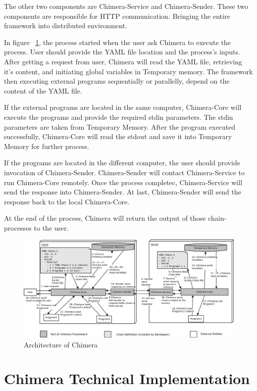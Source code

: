 \documentclass[conference]{IEEEtran}
\begin{document}
The other two components are Chimera-Service and Chimera-Sender. These two components
are responsible for HTTP communication. Bringing the entire framework into distributed
environment.

In figure ~\ref{fig:chimeraArchitecture}, the process started when the user ask Chimera 
to execute the process. User should provide the YAML file location and the process's
inputs. After getting a request from user, Chimera will read the YAML file, retrieving
it's content, and initiating global variables in Temporary memory. The framework then
executing external programs sequentially or parallelly, depend on the content of the
YAML file.

If the external programs are located in the same computer, Chimera-Core will execute the
programs and provide the required stdin parameters. The stdin parameters are taken from
Temporary Memory. After the program executed successfully, Chimera-Core will read the 
stdout and save it into Temporary Memory for further process.

If the programs are located in the different computer, the user should provide
invocation of Chimera-Sender. Chimera-Sender will contact Chimera-Service to run 
Chimera-Core remotely. Once the process completec, Chimera-Service will send the
response into Chimera-Sender. At last, Chimera-Sender will send the response back to
the local Chimera-Core.

At the end of the process, Chimera will return the output of those chain-processes to 
the user.

\begin{figure}
	\centering
	\includegraphics[width=1.0\textwidth]
		{images/chimera.png}
	\caption{Architecture of Chimera}
	\label{fig:chimeraArchitecture}
\end{figure}

\section{Chimera Technical Implementation}
\end{document}

